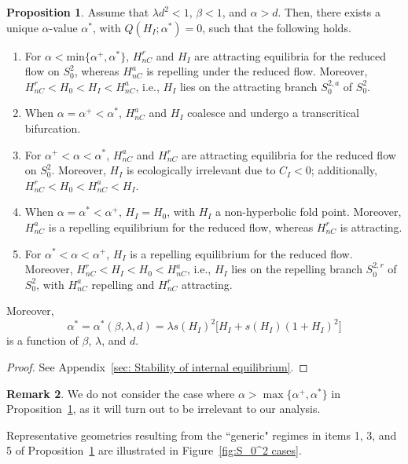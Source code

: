 \documentclass{article}
\theoremstyle{definition}
\numberwithin{equation}{section}
\newtheorem{prop}{Proposition}
\newtheorem{remark}[prop]{Remark}
\begin{document}
\begin{prop}
Assume that $\lambda d^2<1$, $\beta<1$, and $\alpha>d$. Then, there exists a unique $\alpha$-value $\alpha^\ast$, with $Q(H_I; \alpha^\ast)=0$, such that the  following holds.
\begin{enumerate}
    \item For $\alpha<\text{min}\{\alpha^+, \alpha^\ast\}$, $H_{nC}^r$ and $H_{I}$ are attracting equilibria for the reduced flow on $S_0^2$, whereas $H_{nC}^a$ is repelling under the reduced flow. Moreover, $H_{nC}^r<H_0<H_I<H_{nC}^a$, i.e., $H_I$ lies on the attracting branch $S_{0}^{2,a}$ of $S_0^2$.
    \item When $\alpha=\alpha^+<\alpha^\ast$, $H_{nC}^a$ and $H_{I}$ coalesce and undergo a transcritical bifurcation.
    \item For $\alpha^+<\alpha<\alpha^\ast$, $H_{nC}^a$ and $H_{nC}^r$ are attracting equilibria for the reduced flow on $S_0^2$. Moreover, $H_I$ is ecologically irrelevant due to $C_I<0$; additionally, $H_{nC}^r<H_0<H_{nC}^a<H_I$.
    \item When $\alpha=\alpha^\ast<\alpha^+$, $H_I=H_0$, with $H_I$ a non-hyperbolic fold point. Moreover, $H_{nC}^a$ is a repelling equilibrium for the reduced flow, whereas $H_{nC}^r$ is attracting.
    \item For $\alpha^\ast<\alpha<\alpha^+$, $H_I$ is a repelling equilibrium for the reduced flow. Moreover, $H_{nC}^r<H_I<H_0<H_{nC}^a$, i.e., $H_I$ lies on the repelling branch $S_{0}^{2,r}$ of $S_0^2$, with $H_{nC}^a$ repelling and $H_{nC}^r$ attracting.
\end{enumerate}
Moreover, 
\begin{equation}
\alpha^\ast=\alpha^\ast(\beta,\lambda,d)=\lambda s(H_I)^2\big[H_I+s(H_I)(1+H_I)^2 \big]
\label{alpha star of H_I}
\end{equation}
is a function of $\beta$, $\lambda$, and $d$.
\label{prop: equilibrium stability}
\end{prop}
\begin{proof}
See Appendix~\ref{sec: Stability of internal equilibrium}.
\end{proof}
\begin{remark}
We do not consider the case where $\alpha>\max\{\alpha^+,\alpha^\ast\}$ in Proposition~\ref{prop: equilibrium stability}, as it will turn out to be irrelevant to our analysis.
\end{remark}
Representative geometries resulting from the ``generic" regimes in items 1, 3, and 5 of Proposition~\ref{prop: equilibrium stability} are illustrated in Figure~\ref{fig:S_0^2 cases}.
\end{document}
